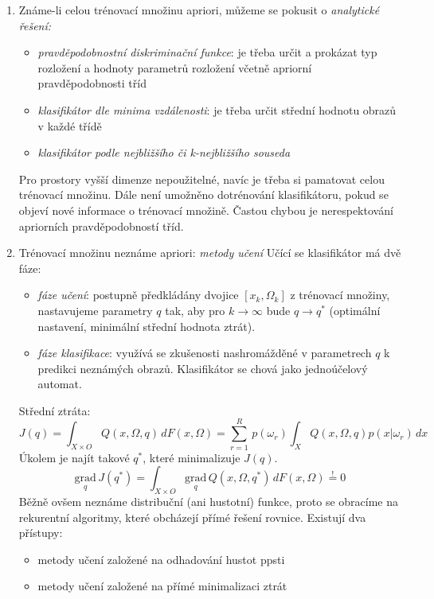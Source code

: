 \begin{enumerate}[label=(\alph*)]
\item Známe-li celou trénovací množinu apriori, můžeme se pokusit o \textit{analytické řešení:}
\begin{itemize}
\item \textit{pravděpodobnostní diskriminační funkce}: je třeba určit a prokázat typ rozložení a hodnoty parametrů rozložení včetně apriorní pravděpodobnosti tříd
\item \textit{klasifikátor dle minima vzdálenosti}: je třeba určit střední hodnotu obrazů v každé třídě
\item \textit{klasifikátor podle nejbližšího či k-nejbližšího souseda}
\end{itemize}
Pro prostory vyšší dimenze nepoužitelné, navíc je třeba si pamatovat celou trénovací množinu. Dále není umožněno dotrénování klasifikátoru, pokud se objeví nové informace o trénovací množině. Častou chybou je nerespektování apriorních pravděpodobností tříd.
\item Trénovací množinu neznáme apriori: \textit{metody učení}
Učící se klasifikátor má dvě fáze:
\begin{itemize}
\item \textit{fáze učení}: postupně předkládány dvojice $ [x_k, \Omega_k] $ z trénovací množiny, nastavujeme parametry $ q $ tak, aby pro $ k \to \infty $ bude $ q \to q^* $ (optimální nastavení, minimální střední hodnota ztrát).
\item \textit{fáze klasifikace}: využívá se zkušenosti nashromážděné v parametrech $ q $ k predikci neznámých obrazů. Klasifikátor se chová jako jednoúčelový automat.
\end{itemize}
Střední ztráta:
\begin{equation}
J(q) = \displaystyle{\int_{X \times O}} Q(x, \Omega, q) \, dF(x, \Omega) = \displaystyle{\sum_{r=1}^R} \, p(\omega_r) \displaystyle{\int_{X}} Q(x, \Omega, q) p(x|\omega_r) \, dx
\end{equation}
Úkolem je najít takové $ q^* $, které minimalizuje $ J(q) $.
\begin{equation}
\underset{q}{\mathrm{grad}} \, J(q^*) = \displaystyle{\int_{X \times O}} \underset{q}{\mathrm{grad}} \, Q(x, \Omega, q^*) \, dF(x, \Omega) \overset{!}{=} 0
\end{equation}
Běžně ovšem neznáme distribuční (ani hustotní) funkce, proto se obracíme na rekurentní algoritmy, které obcházejí přímé řešení rovnice. Existují dva přístupy:
\begin{itemize}
\item metody učení založené na odhadování hustot ppsti
\item metody učení založené na přímé minimalizaci ztrát
\end{itemize}
\end{enumerate}

